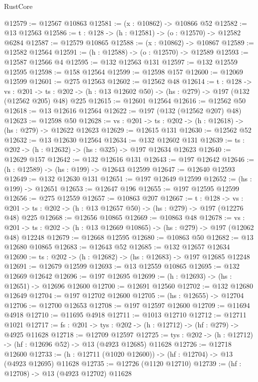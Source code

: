 \begin{lexlean}{RustCore}
\begin{coremodule}
@12579 := @12567 @10863
@12581 := (x : @10862) -> @10866 @52
@12582 := @13 @12563
@12586 := {t : @128} -> (h : @12581) -> (o : @12570) -> @12582 @6284
@12587 := @12579 @10865
@12588 := (x : @10862) -> @10867
@12589 := @12582 @12564
@12591 := (h : @12588) -> (o : @12570) -> @12589
@12593 := @12587 @12566 @4
@12595 := @132 @12563 @131
@12597 := @132 @12559 @12595
@12598 := @158 @12564
@12599 := @12598 @157
@12600 := @12069 @12599
@12601 := @275 @12563
@12602 := @12562 @48
@12614 := {t : @128} ->
  {vs : @201} ->
  {ts : @202} -> (h : @13 @12602 @50) -> (hs : @279) -> @197 (@132 (@12562 @205) @48) @225
@12615 := @12601 @12564
@12616 := @12562 @50
@12618 := @13 @12616 @12564
@12622 := @197 (@132 (@12562 @207) @48)
@12623 := @12598 @50
@12628 := {vs : @201} -> {ts : @202} -> (h : @12618) -> (hs : @279) -> @12622 @12623
@12629 := @12615 @131
@12630 := @12562 @52
@12632 := @13 @12630 @12564
@12634 := @132 @12602 @131
@12639 := {ts : @202} -> (h : @12632) -> (hs : @325) -> @197 @12634 @12623
@12640 := @12629 @157
@12642 := @132 @12616 @131
@12643 := @197 @12642
@12646 := (h : @12589) -> (hs : @199) -> @12643 @12599
@12647 := @12640 @12593
@12649 := @132 @12630 @131
@12651 := @197 @12649 @12599
@12652 := (hs : @199) -> @12651
@12653 := @12647 @196
@12655 := @197 @12595 @12599
@12656 := @275 @12559
@12657 := @10863 @207
@12667 := {t : @128} ->
  {vs : @201} -> {ts : @202} -> (h : @13 @12657 @50) -> (hs : @279) -> @197 (@12276 @48) @225
@12668 := @12656 @10865
@12669 := @10863 @48
@12678 := {vs : @201} ->
  {ts : @202} -> (h : @13 @12669 @10865) -> (hs : @279) -> @197 (@12062 @48) @12248
@12679 := @12668 @12595
@12680 := @10863 @50
@12682 := @13 @12680 @10865
@12683 := @12643 @52
@12685 := @132 @12657 @12634
@12690 := {ts : @202} -> (h : @12682) -> (hs : @12683) -> @197 @12685 @12248
@12691 := @12679 @12599
@12693 := @13 @12559 @10865
@12695 := @132 @12669 @12642
@12696 := @197 @12695
@12699 := (h : @12693) -> (hs : @12651) -> @12696 @12600
@12700 := @12691 @12560
@12702 := @132 @12680 @12649
@12704 := @197 @12702 @12600
@12705 := (hs : @12655) -> @12704
@12706 := @12700 @12653
@12708 := @197 @12597 @12600
@12709 := @11694 @4918
@12710 := @11695 @4918
@12711 := @1013 @12710
@12712 := @12711 @1021
@12717 := {fs : @201} -> {tys : @202} -> (h : @12712) -> (hf : @279) -> @4925 @11628
@12718 := @12709 @12597
@12725 := {tys : @202} -> (h : @12712) -> (hf : @12696 @52) -> @13 (@4923 @12685) @11628
@12726 := @12718 @12600
@12733 := (h : @12711 (@1020 @12600)) -> (hf : @12704) -> @13 (@4923 @12695) @11628
@12735 := @12726 (@1120 @12710)
@12739 := (hf : @12708) -> @13 (@4923 @12702) @11628

\end{coremodule}
\end{lexlean}
